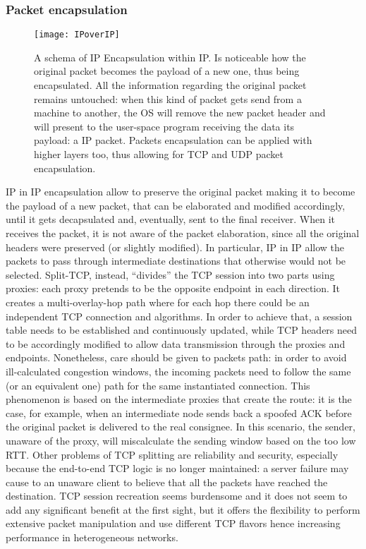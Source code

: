 \subsubsection*{Packet encapsulation}
\begin{figure}[t]
  \centering \texttt{[image: IPoverIP]}
  \caption[IP Encapsulation within IP packet schema]{A schema of IP
    Encapsulation within IP. Is noticeable how the original packet becomes the
    payload of a new one, thus being encapsulated. All the information
    regarding the original packet remains untouched: when this kind of packet
    gets send from a machine to another, the OS will remove the new packet
    header and will present to the user-space program receiving the data its
    payload: a IP packet. Packets encapsulation can be applied with higher
    layers too, thus allowing for TCP and UDP packet encapsulation.}
  \label{chap:prjan:img:ip_over_ip}
\end{figure}
IP in IP encapsulation allow to preserve the original packet making it to
become the payload of a new packet, that can be elaborated and modified
accordingly, until it gets decapsulated and, eventually, sent to the
final receiver. When it receives the packet, it is not aware of the packet
elaboration, since all the original headers were preserved (or slightly
modified). In particular, IP in IP allow the packets to pass through
intermediate destinations that otherwise would not be selected. Split-TCP,
instead, ``divides'' the TCP session into two parts using proxies: each proxy
pretends to be the opposite endpoint in each direction. It creates a
multi-overlay-hop path where for each hop there could be an independent TCP
connection and algorithms. In order to achieve that, a session
table needs to be established and continuously updated, while TCP headers need
to be accordingly modified to allow data transmission through the proxies and
endpoints. Nonetheless, care should be given to packets path: in order to avoid
ill-calculated congestion windows, the incoming packets need to follow the same 
(or an equivalent one) path for the same instantiated connection. This
phenomenon is based on the intermediate proxies that create the route: it is the
case, for example, when an intermediate node sends back a spoofed ACK before the
original packet is delivered to the real consignee. In this scenario, the
sender, unaware of the proxy, will miscalculate the sending window based on the
too low RTT. Other problems of TCP splitting are reliability and security,
especially because the end-to-end TCP logic is no longer maintained: a server
failure may cause to an unaware client to believe that all the packets have
reached the destination. TCP session recreation seems burdensome and it does not
seem to add any significant benefit at the first sight, but it offers the
flexibility to perform extensive packet manipulation and use different TCP
flavors hence increasing performance in heterogeneous networks.

